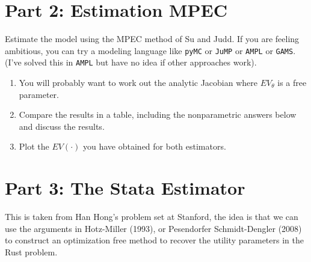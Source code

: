 \documentclass{article}
\begin{document}
\section*{Part 2: Estimation MPEC}
Estimate the model using the MPEC method of Su and Judd. If you are feeling ambitious, you can try a modeling language like \texttt{pyMC} or \texttt{JuMP} or \texttt{AMPL} or \texttt{GAMS}. (I've solved this in \texttt{AMPL} but have no idea if other approaches work).
\begin{enumerate}
\item You will probably want to work out the analytic Jacobian where $EV_{\theta}$ is a free parameter.
\item Compare the results in a table, including the nonparametric answers below and discuss the results.
\item Plot the $EV(\cdot)$ you have obtained for both estimators.
\end{enumerate}



\newpage
\section*{Part 3: The Stata Estimator}
This is taken from Han Hong's problem set at Stanford, the idea is that we can use the arguments in Hotz-Miller (1993), or Pesendorfer Schmidt-Dengler (2008) to construct an optimization free method to recover the utility parameters in the Rust problem.\\
\end{document}
